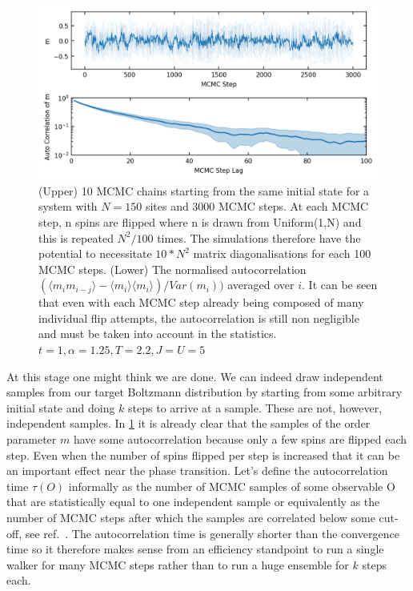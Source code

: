 \hypertarget{fig:m_autocorr}{%
\begin{figure}
\centering
\includegraphics[width=1\textwidth,height=\textheight]{figure_code/fk_chapter/lsr/figs/m_autocorr.png}
\caption[{Autocorrelation in MCMC}]{(Upper) 10 MCMC chains starting from the same initial state for a system with \(N = 150\) sites and 3000 MCMC steps. At each MCMC step, n spins are flipped where n is drawn from Uniform(1,N) and this is repeated \(N^2/100\) times. The simulations therefore have the potential to necessitate \(10*N^2\) matrix diagonalisations for each 100 MCMC steps. (Lower) The normalised autocorrelation \((\langle m_i m_{i-j}\rangle - \langle m_i\rangle \langle m_i \rangle) / Var(m_i))\) averaged over \(i\). It can be seen that even with each MCMC step already being composed of many individual flip attempts, the autocorrelation is still non negligible and must be taken into account in the statistics. \(t = 1, \alpha = 1.25, T = 2.2, J = U = 5\)}
\label{fig:m_autocorr}
\end{figure}
}

At this stage one might think we are done. We can indeed draw independent samples from our target Boltzmann distribution by starting from some arbitrary initial state and doing \(k\) steps to arrive at a sample. These are not, however, independent samples. In \cref{fig:m_autocorr} it is already clear that the samples of the order parameter \(m\) have some autocorrelation because only a few spins are flipped each step. Even when the number of spins flipped per step is increased that it can be an important effect near the phase transition. Let's define the autocorrelation time \(\tau(O)\) informally as the number of MCMC samples of some observable O that are statistically equal to one independent sample or equivalently as the number of MCMC steps after which the samples are correlated below some cut-off, see ref.~\autocite{krauthIntroductionMonteCarlo1996}. The autocorrelation time is generally shorter than the convergence time so it therefore makes sense from an efficiency standpoint to run a single walker for many MCMC steps rather than to run a huge ensemble for \(k\) steps each.


